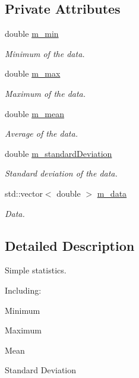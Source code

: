 \subsection*{Private Attributes}
\begin{DoxyCompactItemize}
\item 
double \hyperlink{classcmst_1_1_stat_a2f503d58c0bc9eed8bd6d2c46edffbf4}{m\_min}
\begin{DoxyCompactList}\small\item\em Minimum of the data. \end{DoxyCompactList}\item 
double \hyperlink{classcmst_1_1_stat_a93f52caf45b449d34c87fcbb0ebaa93e}{m\_max}
\begin{DoxyCompactList}\small\item\em Maximum of the data. \end{DoxyCompactList}\item 
double \hyperlink{classcmst_1_1_stat_a0fc650572d2cea2bae2190188f3a03cf}{m\_mean}
\begin{DoxyCompactList}\small\item\em Average of the data. \end{DoxyCompactList}\item 
double \hyperlink{classcmst_1_1_stat_aa6321c420c546603588be13de4628957}{m\_standardDeviation}
\begin{DoxyCompactList}\small\item\em Standard deviation of the data. \end{DoxyCompactList}\item 
std::vector$<$ double $>$ \hyperlink{classcmst_1_1_stat_a8c6fad792b12d961df5ea2b091cb39f4}{m\_data}
\begin{DoxyCompactList}\small\item\em Data. \end{DoxyCompactList}\end{DoxyCompactItemize}


\subsection{Detailed Description}
Simple statistics.

Including:
\begin{DoxyItemize}
\item Minimum
\item Maximum
\item Mean
\item Standard Deviation 
\end{DoxyItemize}

